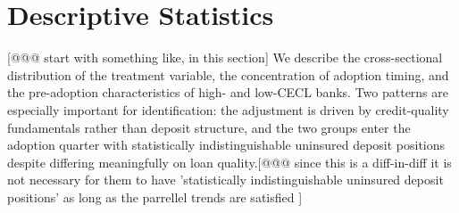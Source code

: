 
\section{Descriptive Statistics}
\label{sec:descriptive}
[@@@ start with something like, in this section]
We describe the cross-sectional distribution of the treatment variable, the
concentration of adoption timing, and the pre-adoption characteristics of
high- and low-CECL banks.  Two patterns are especially important for
identification: the adjustment is driven by credit-quality fundamentals rather
than deposit structure, and the two groups enter the adoption quarter with
statistically indistinguishable uninsured deposit positions despite differing
meaningfully on loan quality.[@@@ since this is a diff-in-diff it is not necessary for them to have 'statistically indistinguishable uninsured deposit positions' as long as the parrellel trends are satisfied ]

